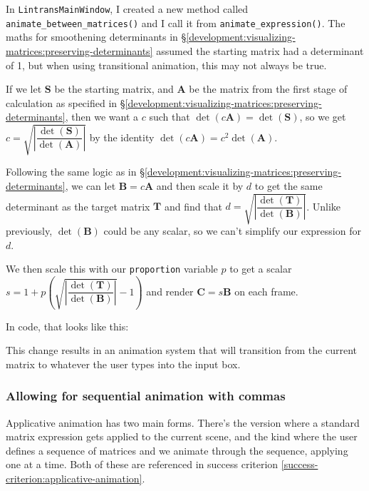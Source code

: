 \documentclass[../development.tex]{subfiles}
\begin{document}
In \texttt{LintransMainWindow}, I created a new method called \texttt{animate\_between\_matrices()} and I call it from \texttt{animate\_expression()}. The maths for smoothening determinants in \S\ref{development:visualizing-matrices:preserving-determinants} assumed the starting matrix had a determinant of 1, but when using transitional animation, this may not always be true.

If we let $\mathbf{S}$ be the starting matrix, and $\mathbf{A}$ be the matrix from the first stage of calculation as specified in \S\ref{development:visualizing-matrices:preserving-determinants}, then we want a $c$ such that $\det(c\mathbf{A}) = \det(\mathbf{S})$, so we get $c = \sqrt{\left|\dfrac{\det(\mathbf{S})}{\det(\mathbf{A})}\right|}$ by the identity $\det(c\mathbf{A}) = c^2 \det(\mathbf{A})$.

Following the same logic as in \S\ref{development:visualizing-matrices:preserving-determinants}, we can let $\mathbf{B} = c\mathbf{A}$ and then scale it by $d$ to get the same determinant as the target matrix $\mathbf{T}$ and find that $d = \sqrt{\left|\dfrac{\det(\mathbf{T})}{\det(\mathbf{B})}\right|}$. Unlike previously, $\det(\mathbf{B})$ could be any scalar, so we can't simplify our expression for $d$.

We then scale this with our \texttt{proportion} variable $p$ to get a scalar $s = 1 + p\left(\sqrt{\left|\dfrac{\det(\mathbf{T})}{\det(\mathbf{B})}\right|} - 1\right)$ and render $\mathbf{C} = s\mathbf{B}$ on each frame.

In code, that looks like this:


This change results in an animation system that will transition from the current matrix to whatever the user types into the input box.

\subsubsection{Allowing for sequential animation with commas\label{development:improving-the-gui:allowing-for-sequential-animation-with-commas}}

Applicative animation has two main forms. There's the version where a standard matrix expression gets applied to the current scene, and the kind where the user defines a sequence of matrices and we animate through the sequence, applying one at a time. Both of these are referenced in success criterion \ref{success-criterion:applicative-animation}.
\end{document}
